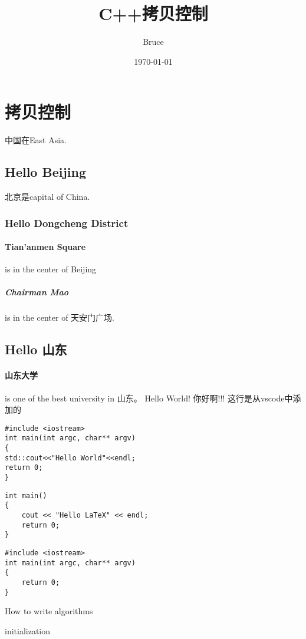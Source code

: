 \documentclass{article}
\title{C++拷贝控制}
\author{Bruce}
\date{\today}
\begin{document}
\maketitle
\tableofcontents

\section{拷贝控制}
中国在East Asia.
\subsection{Hello Beijing}
北京是capital of China.
\subsubsection{Hello Dongcheng District}
\paragraph{Tian'anmen Square}
is in the center of Beijing
\subparagraph{Chairman Mao}
is in the center of 天安门广场.
\subsection{Hello 山东}
\paragraph{山东大学} is one of the best university in 山东。\newline
Hello World! 你好啊!!!
这行是从vscode中添加的


\begin{verbatim}
#include <iostream>
int main(int argc, char** argv)
{
std::cout<<"Hello World"<<endl;
return 0;
}
\end{verbatim}

\begin{verbatim}
int main()
{
    cout << "Hello LaTeX" << endl;
    return 0;
}
\end{verbatim}

\begin{lstlisting}[caption= hello world]
#include <iostream>
int main(int argc, char** argv)
{
    return 0;
}
\end{lstlisting}




\begin{algorithm}[H]
\caption{How to write algorithms}
initialization\;
\end{algorithm}
\end{document}
